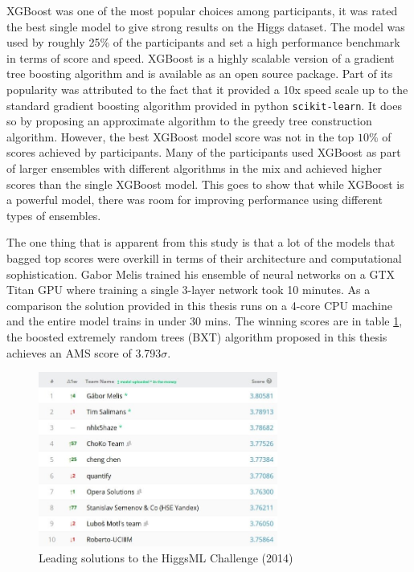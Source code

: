 XGBoost \cite{xgb} was one of the most popular choices among participants, it was rated the best single model to give strong results on the Higgs dataset. The model was used by roughly 25$\%$ of the participants and set a high performance benchmark in terms of score and speed. XGBoost is a highly scalable version of a gradient tree boosting algorithm and is available as an open source package. Part of its popularity was attributed to the fact that it provided a 10x speed scale up to the standard gradient boosting algorithm provided in python \texttt{scikit-learn}. It does so by proposing an approximate algorithm to the greedy tree construction algorithm. However, the best XGBoost model score was not in the top $10\%$ of scores achieved by participants. Many of the participants used XGBoost as part of larger ensembles with different algorithms in the mix and achieved higher scores than the single XGBoost model. This goes to show that while XGBoost is a powerful model, there was room for improving performance using different types of ensembles.  

The one thing that is apparent from this study is that a lot of the models that bagged top scores were overkill in terms of their architecture and computational sophistication. Gabor Melis trained his ensemble of neural networks on a GTX Titan GPU where training a single 3-layer network took 10 minutes. As a comparison the solution provided in this thesis runs on a 4-core CPU machine and the entire model trains in under 30 mins. The winning scores are in table \ref{leader}, the boosted extremely random trees (BXT) algorithm proposed in this thesis achieves an AMS score of 3.793$\sigma$. 

\begin{figure}
\centering
\includegraphics[width=0.7\textwidth]{images/leaderboard_final.jpg}
\caption{Leading solutions to the HiggsML Challenge (2014)}
\label{leader}
\end{figure}


